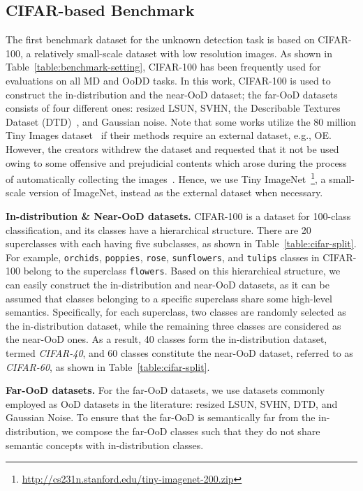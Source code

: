 \documentclass[preprint,12pt]{elsarticle}
\begin{document}
\subsection{CIFAR-based Benchmark}
The first benchmark dataset for the unknown detection task is based on CIFAR-100, a relatively small-scale dataset with low resolution images. As shown in Table~\ref{table:benchmark-setting}, CIFAR-100 has been frequently used for evaluations on all MD and OoDD tasks. In this work, CIFAR-100 is used to construct the in-distribution and the near-OoD dataset; the far-OoD datasets consists of four different ones: resized LSUN, SVHN, the Describable Textures Dataset (DTD)~\citep{cimpoi2014describing}, and Gaussian noise. Note that some works utilize the 80 million Tiny Images dataset~\citep{torralba2008tinyimages} if their methods require an external dataset, e.g., OE. However, the creators withdrew the dataset and requested that it not be used owing to some offensive and prejudicial contents which arose during the process of automatically collecting the images~\citep{birhane2021pyrrhic}. Hence, we use Tiny ImageNet~\footnote{\href{http://cs231n.stanford.edu/tiny-imagenet-200.zip}{http://cs231n.stanford.edu/tiny-imagenet-200.zip}}, a small-scale version of ImageNet, instead as the external dataset when necessary. 

\textbf{In-distribution \& Near-OoD datasets.}
CIFAR-100 is a dataset for 100-class classification, and its classes have a hierarchical structure. There are 20 superclasses with each having five subclasses, as shown in Table~\ref{table:cifar-split}. For example, \texttt{orchids}, \texttt{poppies}, \texttt{rose}, \texttt{sunflowers}, and \texttt{tulips} classes in CIFAR-100 belong to the superclass \texttt{flowers}. Based on this hierarchical structure, we can easily construct the in-distribution and near-OoD datasets, as it can be assumed that classes belonging to a specific superclass share some high-level semantics. Specifically, for each superclass, two classes are randomly selected as the in-distribution dataset, while the remaining three classes are considered as the near-OoD ones. As a result, 40 classes form the in-distribution dataset, termed \emph{CIFAR-40}, and 60 classes constitute the near-OoD dataset, referred to as \emph{CIFAR-60}, as shown in Table~\ref{table:cifar-split}.

\textbf{Far-OoD datasets.}
For the far-OoD datasets, we use datasets commonly employed as OoD datasets in the literature: resized LSUN, SVHN, DTD, and Gaussian Noise. To ensure that the far-OoD is semantically far from the in-distribution, we compose the far-OoD classes such that they do not share semantic concepts with in-distribution classes.
\end{document}
